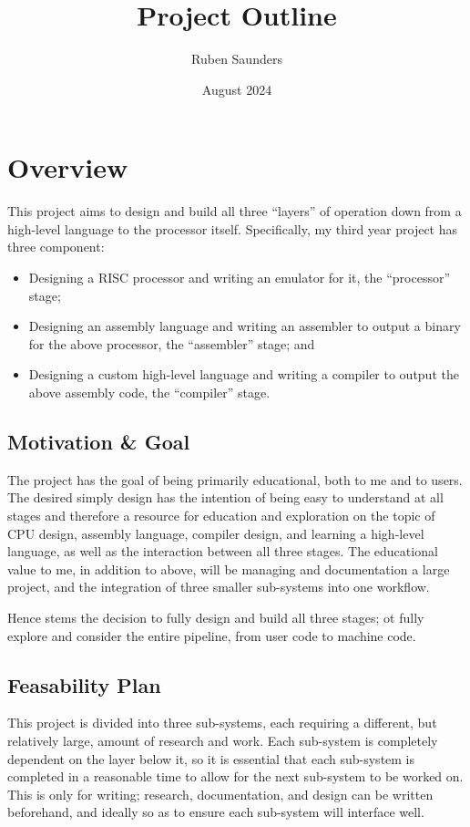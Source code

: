 \documentclass{article}
\title{Project Outline}
\author{Ruben Saunders}
\date{August 2024}
\begin{document}
\maketitle
\tableofcontents

\newpage

\section{Overview}

This project aims to design and build all three ``layers'' of operation down from a high-level language to the processor itself.
Specifically, my third year project has three component:
\begin{itemize}
    \item Designing a RISC processor and writing an emulator for it, the ``processor'' stage;
    \item Designing an assembly language and writing an assembler to output a binary for the above processor, the ``assembler'' stage; and
    \item Designing a custom high-level language and writing a compiler to output the above assembly code, the ``compiler'' stage.
\end{itemize}

\subsection{Motivation \& Goal}

The project has the goal of being primarily educational, both to me and to users.
The desired simply design has the intention of being easy to understand at all stages and therefore a resource for education and exploration on the topic of CPU design, assembly language, compiler design, and learning a high-level language, as well as the interaction between all three stages.
The educational value to me, in addition to above, will be managing and documentation a large project, and the integration of three smaller sub-systems into one workflow.

Hence stems the decision to fully design and build all three stages; ot fully explore and consider the entire pipeline, from user code to machine code.

\subsection{Feasability Plan}

This project is divided into three sub-systems, each requiring a different, but relatively large, amount of research and work.
Each sub-system is completely dependent on the layer below it, so it is essential that each sub-system is completed in a reasonable time to allow for the next sub-system to be worked on.
This is only for writing; research, documentation, and design can be written beforehand, and ideally so as to ensure each sub-system will interface well.
\end{document}
